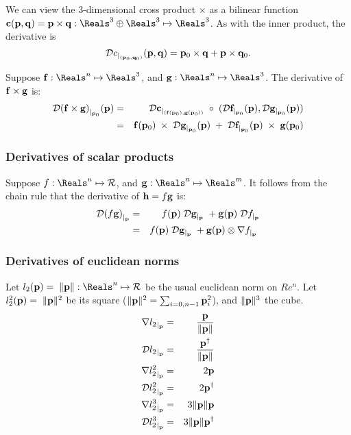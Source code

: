 We can view the 3-dimensional cross product
$ \times $
as a bilinear function
$\c(\p,\q) = \p \times \q : \Reals^3 \oplus \Reals^3 \mapsto \Reals^3$.
As with the inner product,
the derivative is
\begin{equation}
{\mathcal{D}{c}_{\mid_{({\mathbf p}_0,{\mathbf q}_0)}}({{\mathbf p},{\mathbf q}})} = {\mathbf p}_0 \times {\mathbf q} + {\mathbf p} \times {\mathbf q}_0.
\end{equation}

Suppose
$\f:\Reals^{n} \mapsto \Reals^3$, and
$\g:\Reals^{n} \mapsto \Reals^3$.
The derivative of ${\mathbf f} \times {\mathbf g}$ is:
\begin{eqnarray}
{\mathcal{D}{({\mathbf f}\times {\mathbf g})}_{\mid_{{\mathbf p}_0}}({{\mathbf p}})}
& =
& {\mathcal{D}{{\mathbf c}}_{\mid_{({\mathbf f}({\mathbf p}_0),{\mathbf g}({\mathbf p}_0))}}} \;\circ \;({\mathcal{D}{{\mathbf f}}_{\mid_{{\mathbf p}_0}}({{\mathbf p}})}, {\mathcal{D}{{\mathbf g}}_{\mid_{{\mathbf p}_0}}({{\mathbf p}})})
\\
& =
& {\mathbf f}({\mathbf p}_0) \;\times \;{\mathcal{D}{{\mathbf g}}_{\mid_{{\mathbf p}_0}}({{\mathbf p}})} \;+ \;{\mathcal{D}{{\mathbf f}}_{\mid_{{\mathbf p}_0}}({{\mathbf p}})} \;\times \;{\mathbf g}({\mathbf p}_0) \nonumber
\end{eqnarray}


\subsubsection{Derivatives of scalar products}
\label{sec:scalar}

Suppose
$f:\Reals^{n} \mapsto \Re$, and
$\g:\Reals^{n} \mapsto \Reals^m$.
It follows from the chain rule that the derivative of ${\mathbf h} = f{\mathbf g}$ is:
\begin{eqnarray}
\label{eq:scalar_product_derivative}
\Db{(f\g)}{\p}
& = & f(\p) \;\Db{\g}{\p} \;+ \g(\p) \; \Db{f}{\p}  \\
& = & f(\p) \;\Db{\g}{\p} \;+ \g(\p) \otimes \Gb{f}{\p} \; \nonumber
\end{eqnarray}



\subsubsection{Derivatives of euclidean norms}
\label{sec:norms}

Let $l_2(\p) = \; \| \p  \|: \Reals^n \mapsto \Re$ 
be the usual euclidean norm on $Re^n$.
Let $l_2^2({\mathbf p}) = \; \| {\mathbf p}  \|^2 $
be its square
($ \| {\mathbf p}  \|^2  = \sum_{i=0,n-1} {\mathbf p}_i^2$),
and $ \| {\mathbf p}  \|^3$ the cube.
\begin{eqnarray}
\label{eq:l2-gradient}
\Gb{l_2}{\p} & = & {{ \p } \over { \| \p  \|}} \\
\Db{l_2}{\p} & = &{{ \p^\dagger } \over { \| \p  \|}} \nonumber \\
\Gb{l_2^2}{\p} & = & 2\p \nonumber \\ 
\Db{l_2^2}{\p} & = & 2\p^\dagger \nonumber \\
\Gb{l_2^3}{\p} & = & 3 \| \p  \| \p \nonumber \\
\Db{l_2^3}{\p} & = & 3 \| \p  \| \p^\dagger \nonumber
\end{eqnarray}

